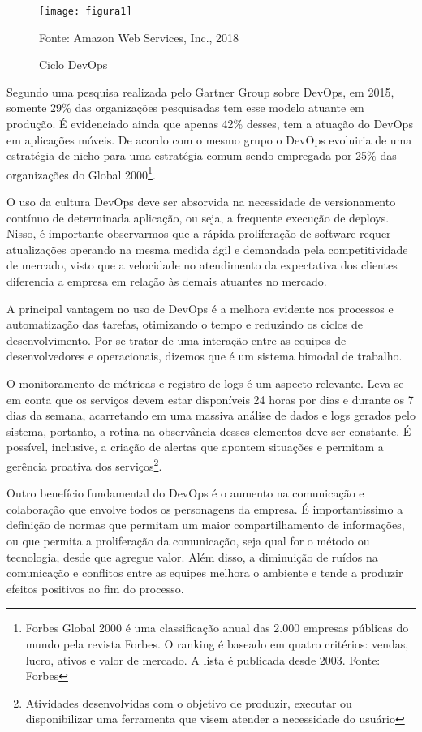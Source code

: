 \begin{figure}[htb] %
	\centering
	\texttt{[image: figura1]}
	\caption{Ciclo DevOps}
	Fonte: Amazon Web Services, Inc., 2018
	\label{fig:figura1}
\end{figure}

Segundo uma pesquisa realizada pelo Gartner Group sobre DevOps, em 2015, somente 29\% das organizações pesquisadas tem esse modelo atuante em produção. É evidenciado ainda que apenas 42\% desses, tem a atuação do DevOps em aplicações móveis. De acordo com o mesmo grupo o DevOps evoluiria de uma estratégia de nicho para uma estratégia comum sendo empregada por 25\% das organizações do Global 2000\footnote{Forbes Global 2000 é uma classificação anual das 2.000 empresas públicas do mundo pela revista Forbes. O ranking é baseado em quatro critérios: vendas, lucro, ativos e valor de mercado. A lista é publicada desde 2003. Fonte: Forbes}.\cite{gartnerglobal}

O uso da cultura DevOps deve ser absorvida na necessidade de versionamento contínuo de determinada aplicação, ou seja, a frequente execução de deploys. Nisso, é importante observarmos que a rápida proliferação de software requer atualizações operando na mesma medida ágil e demandada pela competitividade de mercado, visto que a velocidade no atendimento da expectativa dos clientes diferencia a empresa em relação às demais atuantes no mercado.

A principal vantagem no uso de DevOps é a melhora evidente nos processos e automatização das tarefas, otimizando o tempo e reduzindo os ciclos de desenvolvimento. Por se tratar de uma interação entre as equipes de desenvolvedores e operacionais, dizemos que é um sistema bimodal de trabalho.\cite{sato2014devops}

O monitoramento de métricas e registro de logs é um aspecto relevante. Leva-se em conta que os serviços devem estar disponíveis 24 horas por dias e durante os 7 dias da semana, acarretando em uma massiva análise de dados e logs gerados pelo sistema, portanto, a rotina na observância desses elementos deve ser constante. É possível, inclusive, a criação de alertas que apontem situações e permitam a gerência proativa dos serviços\footnote{Atividades desenvolvidas com o objetivo de produzir, executar ou disponibilizar uma ferramenta que visem atender a necessidade do usuário}.

Outro benefício fundamental do DevOps é o aumento na comunicação e colaboração que envolve todos os personagens da empresa. É importantíssimo a definição de normas que permitam um maior compartilhamento de informações, ou que permita a proliferação da comunicação, seja qual for o método ou tecnologia, desde que agregue valor. Além disso, a diminuição de ruídos na comunicação e conflitos entre as equipes melhora o ambiente e tende a produzir efeitos positivos ao fim do processo.\cite{gaea}

